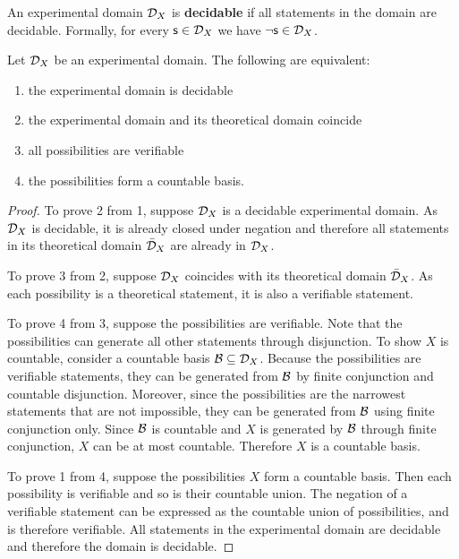 \documentclass[11pt,letterpaper,fleqn]{memoir} %
\begin{document}
\begin{mathSection}
\begin{defn}
	An experimental domain $\mathcal{D}_X$ is \textbf{decidable} if all statements in the domain are decidable. Formally, for every $\mathsf{s} \in \mathcal{D}_X$ we have $\neg\mathsf{s} \in \mathcal{D}_X$.
\end{defn}

\begin{prop}\label{1_prop_decidable_domain_properties}
	Let $\mathcal{D}_X$ be an experimental domain. The following are equivalent:
	\begin{enumerate}
		\item the experimental domain is decidable
		\item the experimental domain and its theoretical domain coincide
		\item all possibilities are verifiable
		\item the possibilities form a countable basis.
	\end{enumerate}
\end{prop}

\begin{proof}
	To prove 2 from 1, suppose $\mathcal{D}_X$ is a decidable experimental domain. As $\mathcal{D}_X$ is decidable, it is already closed under negation and therefore all statements in its theoretical domain $\bar{\mathcal{D}}_X$ are already in $\mathcal{D}_X$.
	
	To prove 3 from 2, suppose $\mathcal{D}_X$ coincides with its theoretical domain $\bar{\mathcal{D}}_X$. As each possibility is a theoretical statement, it is also a verifiable statement.
	
	To prove 4 from 3, suppose the possibilities are verifiable. Note that the possibilities can generate all other statements through disjunction. To show $X$ is countable, consider a countable basis $\mathcal{B} \subseteq \mathcal{D}_X$. Because the possibilities are verifiable statements, they can be generated from $\mathcal{B}$ by finite conjunction and countable disjunction. Moreover, since the possibilities are the narrowest statements that are not impossible, they can be generated from $\mathcal{B}$ using finite conjunction only. Since $\mathcal{B}$ is countable and $X$ is generated by $\mathcal{B}$ through finite conjunction, $X$ can be at most countable. Therefore $X$ is a countable basis.
	
	To prove 1 from 4, suppose the possibilities $X$ form a countable basis. Then each possibility is verifiable and so is their countable union. The negation of a verifiable statement can be expressed as the countable union of possibilities, and is therefore verifiable. All statements in the experimental domain are decidable and therefore the domain is decidable.
\end{proof}
\end{mathSection}
\end{document}
